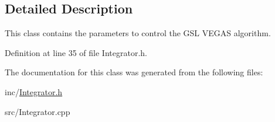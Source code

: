 \subsection{Detailed Description}
This class contains the parameters to control the G\-S\-L V\-E\-G\-A\-S algorithm. 

Definition at line 35 of file Integrator.\-h.



The documentation for this class was generated from the following files\-:\begin{DoxyCompactItemize}
\item 
inc/\hyperlink{Integrator_8h}{Integrator.\-h}\item 
src/Integrator.\-cpp\end{DoxyCompactItemize}
